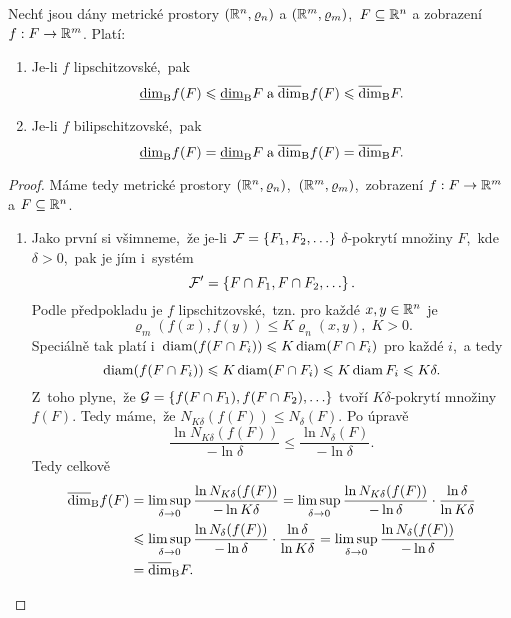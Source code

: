 \begin{theorem}\label{thm:bc-dimenze-bi-lipschitzovska-zobrazeni}
    Nechť jsou dány metrické prostory $(\mathbb{R}^n,\varrho_n)$ a $(\mathbb{R}^m,\varrho_m)$,~$F\subseteq\mathbb{R}^n$ a zobrazení $f:F \rightarrow \mathbb{R}^m$. Platí:
    \begin{enumerate}[label=(\roman*)]
        \item\label{thm:bc-dimenze-lipschitz} Je-li $f$ lipschitzovské,~pak
        \[\underline{\dim}_\textup{B}{f(F)}\leqslant\underline{\dim}_\textup{B}{F}\;\text{a}\;\overline{\dim}_\textup{B}{f(F)}\leqslant\overline{\dim}_\textup{B}{F}.\]
        \item\label{thm:bc-dimenze-bilipschitz} Je-li $f$ bilipschitzovské,~pak
        \[\underline{\dim}_\textup{B}{f(F)}=\underline{\dim}_\textup{B}{F}\;\text{a}\;\overline{\dim}_\textup{B}{f(F)}=\overline{\dim}_\textup{B}{F}.\]
    \end{enumerate}
\end{theorem}
\begin{proof}
    Máme tedy metrické prostory $(\mathbb{R}^n,\varrho_n)$,~$(\mathbb{R}^m,\varrho_m)$,~zobrazení $f:F \rightarrow \mathbb{R}^m$ a $F\subseteq\mathbb{R}^n$.
    \begin{enumerate}[label=\textit{(\roman*)}]
        \item Jako první si všimneme,~že je-li $\mathcal{F}=\left\{F_1,F_2,\ldots\right\}$ $\delta$-pokrytí množiny $F$,~kde $\delta>0$,~pak je jím i~systém
        \[\mathcal{F}^\prime=\left\{F\cap F_1,F\cap F_2,\ldots\right\}.\]
        Podle předpokladu je $f$ lipschitzovské,~tzn. pro každé $x,y\in\mathbb{R}^n$ je
        \[\varrho_m(f(x),f(y))\leqslant K\varrho_n(x,y),\;K>0.\]
        Speciálně tak platí i~$\operatorname{diam}(f(F\cap F_i))\leqslant K\operatorname{diam}(F\cap F_i)$ pro každé $i$,~a tedy
        \[\operatorname{diam}(f(F\cap F_i))\leqslant K\operatorname{diam}(F\cap F_i)\leqslant K\operatorname{diam}{F_i}\leqslant K\delta.\]
        Z~toho plyne,~že $\mathcal{G}=\left\{f(F\cap F_1),f(F\cap F_2),\ldots\right\}$ tvoří $K\delta$-pokrytí množiny $f(F)$. Tedy máme,~že $N_{K\delta}(f(F))\leqslant N_\delta(F)$. Po úpravě
        \[\dfrac{\ln{N_{K\delta}(f(F))}}{-\ln{\delta}}\leqslant\dfrac{\ln{N_\delta(F)}}{-\ln{\delta}}.\]
        Tedy celkově
        \begin{align*}
            \upperdimB{f(F)}&=\limsup_{\delta\to 0}\dfrac{\ln{N_{K\delta}(f(F))}}{-\ln{K\delta}}=\limsup_{\delta\to 0}\dfrac{\ln{N_{K\delta}(f(F))}}{-\ln{\delta}}\cdot\dfrac{\ln{\delta}}{\ln{K\delta}}\\
            &\leqslant\limsup_{\delta\to 0}\dfrac{\ln{N_{\delta}(f(F))}}{-\ln{\delta}}\cdot\dfrac{\ln{\delta}}{\ln{K\delta}}=\limsup_{\delta\to 0}\dfrac{\ln{N_{\delta}(f(F))}}{-\ln{\delta}}\\
            &=\upperdimB{F}.

\end{align*}
\end{enumerate}
\end{proof}
